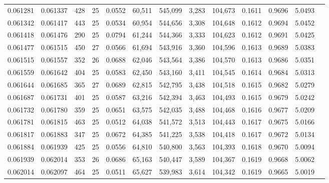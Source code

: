 \begin{tabular}{rrrrrrrrrrrrr}
0.061281 & 0.061337 & 428 &  25 &                                     0.0552 &  60,511 & 545,099 &   3,283 & 104,673 & 0.1611 & 0.9696 & 5.0493 \\
0.061342 & 0.061417 & 443 &  25 &                                     0.0534 &  60,954 & 544,656 &   3,308 & 104,648 & 0.1612 & 0.9694 & 5.0452 \\
0.061418 & 0.061476 & 290 &  25 &                                     0.0794 &  61,244 & 544,366 &   3,333 & 104,623 & 0.1612 & 0.9691 & 5.0425 \\
0.061477 & 0.061515 & 450 &  27 &                                     0.0566 &  61,694 & 543,916 &   3,360 & 104,596 & 0.1613 & 0.9689 & 5.0383 \\
0.061515 & 0.061557 & 352 &  26 &                                     0.0688 &  62,046 & 543,564 &   3,386 & 104,570 & 0.1613 & 0.9686 & 5.0351 \\
0.061559 & 0.061642 & 404 &  25 &                                     0.0583 &  62,450 & 543,160 &   3,411 & 104,545 & 0.1614 & 0.9684 & 5.0313 \\
0.061644 & 0.061685 & 365 &  27 &                                     0.0689 &  62,815 & 542,795 &   3,438 & 104,518 & 0.1615 & 0.9682 & 5.0279 \\
0.061687 & 0.061731 & 401 &  25 &                                     0.0587 &  63,216 & 542,394 &   3,463 & 104,493 & 0.1615 & 0.9679 & 5.0242 \\
0.061732 & 0.061780 & 359 &  25 &                                     0.0651 &  63,575 & 542,035 &   3,488 & 104,468 & 0.1616 & 0.9677 & 5.0209 \\
0.061781 & 0.061815 & 463 &  25 &                                     0.0512 &  64,038 & 541,572 &   3,513 & 104,443 & 0.1617 & 0.9675 & 5.0166 \\
0.061817 & 0.061883 & 347 &  25 &                                     0.0672 &  64,385 & 541,225 &   3,538 & 104,418 & 0.1617 & 0.9672 & 5.0134 \\
0.061884 & 0.061939 & 425 &  25 &                                     0.0556 &  64,810 & 540,800 &   3,563 & 104,393 & 0.1618 & 0.9670 & 5.0094 \\
0.061939 & 0.062014 & 353 &  26 &                                     0.0686 &  65,163 & 540,447 &   3,589 & 104,367 & 0.1619 & 0.9668 & 5.0062 \\
0.062014 & 0.062097 & 464 &  25 &                                     0.0511 &  65,627 & 539,983 &   3,614 & 104,342 & 0.1619 & 0.9665 & 5.0019 \\

\end{tabular}
